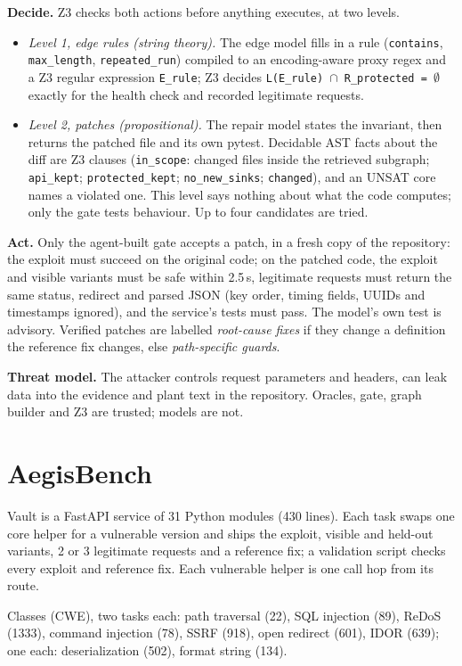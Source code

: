 \documentclass[10pt,a4paper]{article}
\begin{document}
\textbf{Decide.} Z3 checks both actions before anything executes, at two levels.

\begin{itemize}
\item \emph{Level 1, edge rules (string theory).} The edge model fills in a rule (\texttt{contains}, \texttt{max\_length}, \texttt{repeated\_run}) compiled to an encoding-aware proxy regex and a Z3 regular expression \texttt{E\_rule}; Z3 decides \texttt{L(E\_rule) $\cap$ R\_protected = $\emptyset$} exactly for the health check and recorded legitimate requests.
\item \emph{Level 2, patches (propositional).} The repair model states the invariant, then returns the patched file and its own pytest. Decidable AST facts about the diff are Z3 clauses (\texttt{in\_scope}: changed files inside the retrieved subgraph; \texttt{api\_kept}; \texttt{protected\_kept}; \texttt{no\_new\_sinks}; \texttt{changed}), and an UNSAT core names a violated one. This level says nothing about what the code computes; only the gate tests behaviour. Up to four candidates are tried.
\end{itemize}
\textbf{Act.} Only the agent-built gate accepts a patch, in a fresh copy of the repository: the exploit must succeed on the original code; on the patched code, the exploit and visible variants must be safe within 2.5\,s, legitimate requests must return the same status, redirect and parsed JSON (key order, timing fields, UUIDs and timestamps ignored), and the service's tests must pass. The model's own test is advisory. Verified patches are labelled \emph{root-cause fixes} if they change a definition the reference fix changes, else \emph{path-specific guards}.

\textbf{Threat model.} The attacker controls request parameters and headers, can leak data into the evidence and plant text in the repository. Oracles, gate, graph builder and Z3 are trusted; models are not.

\section{AegisBench}
Vault is a FastAPI service of 31 Python modules (430 lines). Each task swaps one core helper for a vulnerable version and ships the exploit, visible and held-out variants, 2 or 3 legitimate requests and a reference fix; a validation script checks every exploit and reference fix. Each vulnerable helper is one call hop from its route.

Classes (CWE), two tasks each: path traversal (22), SQL injection (89), ReDoS (1333), command injection (78), SSRF (918), open redirect (601), IDOR (639); one each: deserialization (502), format string (134).
\end{document}
